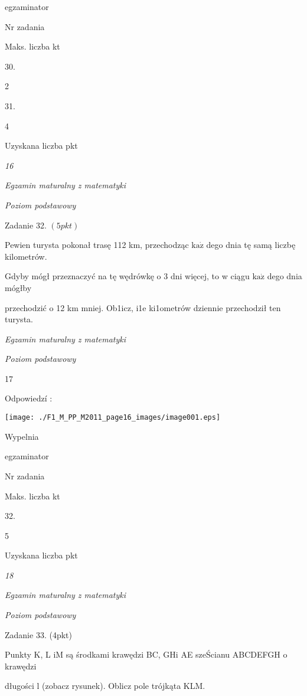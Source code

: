 \documentclass[a4paper,12pt]{article}
\begin{document}
egzaminator

Nr zadania

Maks. liczba kt

30.

2

31.

4

Uzyskana liczba pkt





{\it 16}

{\it Egzamin maturalny z matematyki}

{\it Poziom podstawowy}

Zadanie 32. $(5pkt)$

Pewien turysta pokonał trasę 112 km, przechodząc $\mathrm{k}\mathrm{a}\dot{\mathrm{z}}$ dego dnia tę samą liczbę kilometrów.

Gdyby mógł przeznaczyć na tę wędrówkę o 3 dni więcej, to w ciągu $\mathrm{k}\mathrm{a}\dot{\mathrm{z}}$ dego dnia mógłby

przechodzić o 12 km mniej. Ob1icz, i1e ki1ometrów dziennie przechodził ten turysta.





{\it Egzamin maturalny z matematyki}

{\it Poziom podstawowy}

17

Odpowiedzí :
\begin{center}
\texttt{[image: ./F1\_M\_PP\_M2011\_page16\_images/image001.eps]}
\end{center}
Wypelnia

egzaminator

Nr zadania

Maks. liczba kt

32.

5

Uzyskana liczba pkt





{\it 18}

{\it Egzamin maturalny z matematyki}

{\it Poziom podstawowy}

Zadanie 33. (4pkt)

Punkty K, L iM są środkami krawędzi BC, GHi AE szeŚcianu ABCDEFGH o krawędzi

długości l (zobacz rysunek). Oblicz pole trójkąta KLM.
\end{document}
